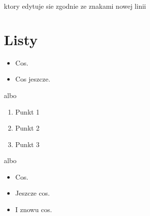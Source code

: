 \documentclass[letterpaper,10pt,english]{sphinxmanual}
\begin{document}
ktory edytuje sie zgodnie
ze znakami nowej linii


\section{Listy}
\label{\detokenize{tutorial:listy}}
\begin{sphinxVerbatim}[commandchars=\\\{\}]
 
  


  
  
  


 
  
   
\end{sphinxVerbatim}
\begin{itemize}
\item {} 
Cos.

\item {} 
Cos jeszcze.

\end{itemize}

albo
\begin{enumerate}
\item {} 
Punkt 1

\item {} 
Punkt 2

\item {} 
Punkt 3

\end{enumerate}

albo
\begin{itemize}
\item {} 
Cos.

\item {} 
Jeszcze cos.

\item {} 
I znowu cos.

\end{itemize}
\end{document}
